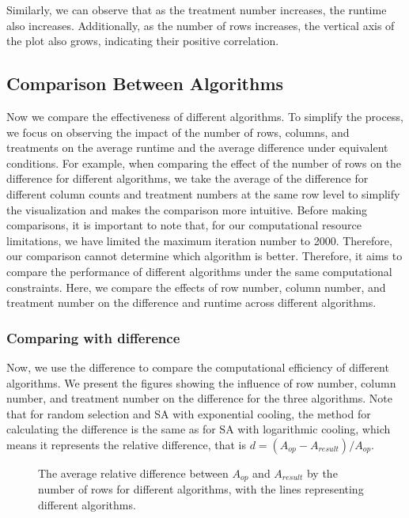 \documentclass[
  a4paper,
  oneside,
  openany,
  12pt,
  onecolumn]{book}
\theoremstyle{definition}
\theoremstyle{definition}
\theoremstyle{plain}
\theoremstyle{remark}
\begin{document}
Similarly, we can observe that as the treatment number increases, the
runtime also increases. Additionally, as the number of rows increases,
the vertical axis of the plot also grows, indicating their positive
correlation.

\subsection{Comparison Between
Algorithms}\label{comparison-between-algorithms}

Now we compare the effectiveness of different algorithms. To simplify
the process, we focus on observing the impact of the number of rows,
columns, and treatments on the average runtime and the average
difference under equivalent conditions. For example, when comparing the
effect of the number of rows on the difference for different algorithms,
we take the average of the difference for different column counts and
treatment numbers at the same row level to simplify the visualization
and makes the comparison more intuitive. Before making comparisons, it
is important to note that, for our computational resource limitations,
we have limited the maximum iteration number to 2000. Therefore, our
comparison cannot determine which algorithm is better. Therefore, it
aims to compare the performance of different algorithms under the same
computational constraints. Here, we compare the effects of row number,
column number, and treatment number on the difference and runtime across
different algorithms.

\subsubsection{Comparing with
difference}\label{comparing-with-difference}

Now, we use the difference to compare the computational efficiency of
different algorithms. We present the figures showing the influence of
row number, column number, and treatment number on the difference for
the three algorithms. Note that for random selection and SA with
exponential cooling, the method for calculating the difference is the
same as for SA with logarithmic cooling, which means it represents the
relative difference, that is \(d = (A_{op}-A_{result})/A_{op}\).

\begin{figure}


\caption{\label{fig-RvD}The average relative difference between
\(A_{op}\) and \(A_{result}\) by the number of rows for different
algorithms, with the lines representing different algorithms.}

\end{figure}%
\end{document}
